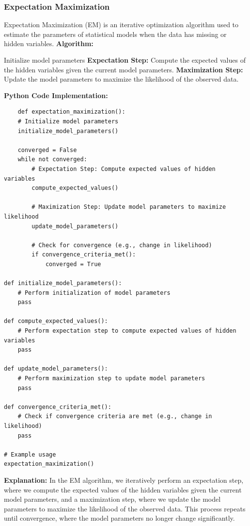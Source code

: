 \documentclass[12pt]{book} %
\begin{document}
\subsubsection{Expectation Maximization}
Expectation Maximization (EM) is an iterative optimization algorithm used to estimate the parameters of statistical models when the data has missing or hidden variables.
\FloatBarrier
\textbf{Algorithm:}
\begin{algorithm}
\caption{Expectation Maximization Algorithm}
\begin{algorithmic}[1]
\State Initialize model parameters
\Repeat
    \State \textbf{Expectation Step:} Compute the expected values of the hidden variables given the current model parameters.
    \State \textbf{Maximization Step:} Update the model parameters to maximize the likelihood of the observed data.
\end{algorithmic}
\end{algorithm}
\FloatBarrier
\textbf{Python Code Implementation:}
\FloatBarrier
\begin{lstlisting}
    def expectation_maximization():
    # Initialize model parameters
    initialize_model_parameters()

    converged = False
    while not converged:
        # Expectation Step: Compute expected values of hidden variables
        compute_expected_values()

        # Maximization Step: Update model parameters to maximize likelihood
        update_model_parameters()

        # Check for convergence (e.g., change in likelihood)
        if convergence_criteria_met():
            converged = True

def initialize_model_parameters():
    # Perform initialization of model parameters
    pass

def compute_expected_values():
    # Perform expectation step to compute expected values of hidden variables
    pass

def update_model_parameters():
    # Perform maximization step to update model parameters
    pass

def convergence_criteria_met():
    # Check if convergence criteria are met (e.g., change in likelihood)
    pass

# Example usage
expectation_maximization()
\end{lstlisting}
\FloatBarrier
\textbf{Explanation:} In the EM algorithm, we iteratively perform an expectation step, where we compute the expected values of the hidden variables given the current model parameters, and a maximization step, where we update the model parameters to maximize the likelihood of the observed data. This process repeats until convergence, where the model parameters no longer change significantly.
\end{document}
